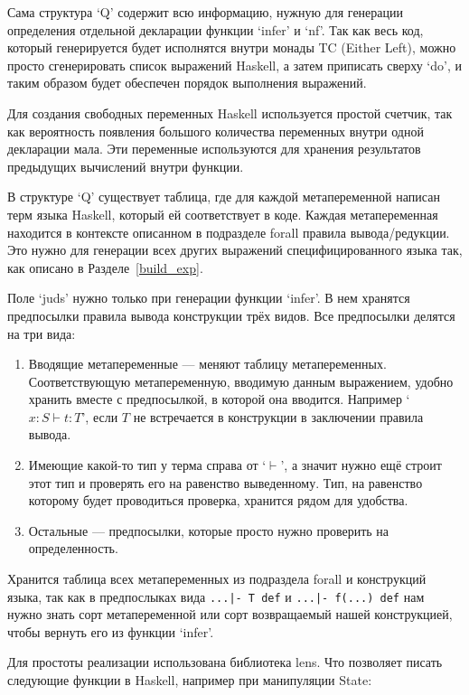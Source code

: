Сама структура `Q' содержит всю информацию, нужную для генерации определения отдельной декларации функции `infer' и `nf'. Так как весь код, который генерируется будет исполнятся внутри монады TC (Either Left), можно просто сгенерировать список выражений Haskell, а затем приписать сверху `do', и таким образом будет обеспечен порядок выполнения выражений.

Для создания свободных переменных Haskell используется простой счетчик, так как вероятность появления большого количества переменных внутри одной декларации мала. Эти переменные используются для хранения результатов предыдущих вычислений внутри функции.

В структуре `Q' существует таблица, где для каждой метапеременной написан терм языка Haskell, который ей соответствует в коде. Каждая метапеременная находится в контексте описанном в подразделе forall правила вывода/редукции. Это нужно для генерации всех других выражений специфицированного языка так, как описано в Разделе~\ref{build_exp}.

Поле `juds' нужно только при генерации функции `infer'. В нем хранятся предпосылки правила вывода конструкции трёх видов. Все предпосылки делятся на три вида:
\begin{enumerate}
  \item Вводящие метапеременные --- меняют таблицу метапеременных. Соответствующую метапеременную, вводимую данным выражением, удобно хранить вместе с предпосылкой, в которой она вводится. Например `$x : S \vdash t : T$', если $T$ не встречается в конструкции в заключении правила вывода.
  \item Имеющие какой-то тип у терма справа от `$\vdash$', а значит нужно ещё строит этот тип и проверять его на равенство выведенному. Тип, на равенство которому будет проводиться проверка, хранится рядом для удобства.
  \item Остальные --- предпосылки, которые просто нужно проверить на определенность.
\end{enumerate}

Хранится таблица всех метапеременных из подраздела forall и конструкций языка, так как в предпослыках вида \lstinline{...|- T def} и \lstinline{...|- f(...) def} нам нужно знать сорт метапеременной или сорт возвращаемый нашей конструкцией, чтобы вернуть его из функции `infer'.

Для простоты реализации использована библиотека lens\cite{lens}. Что позволяет писать следующие функции в Haskell, например при манипуляции State:

